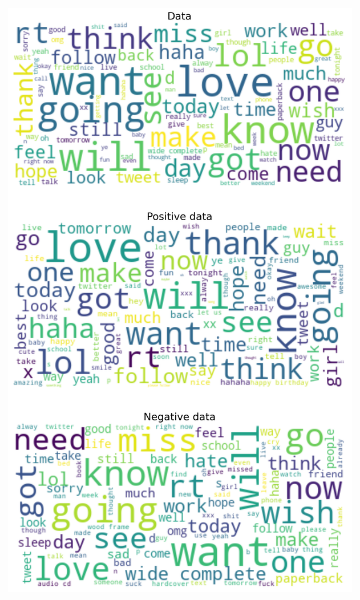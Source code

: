 \documentclass{article}
\begin{document}
\begin{itemize}
\begin{figure}[H]
\begin{subfigure}[b]{0.24\textwidth}
\includegraphics[width=\textwidth]{chapter-06/section-01-01/11/visualization/2/wordcloud.png}
\end{subfigure}
\begin{subfigure}[b]{0.24\textwidth}
\centering

\end{subfigure}
\end{figure}
\end{itemize}
\end{document}
